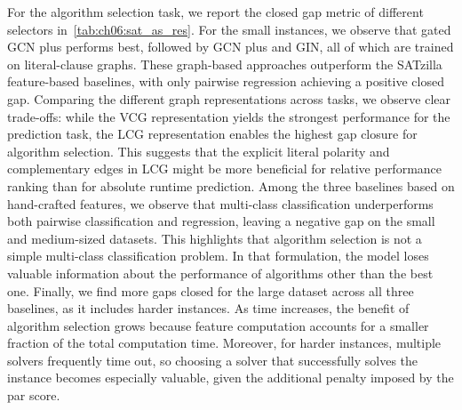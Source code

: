 For the algorithm selection task, we report the
closed gap metric of different selectors in~\cref{tab:ch06:sat_as_res}.
For the small instances, we observe that gated GCN plus performs best, followed by GCN plus and GIN, all of which are trained on literal-clause graphs. These graph-based approaches outperform the SATzilla feature-based baselines, with only pairwise regression achieving a positive closed gap. Comparing the different graph representations across tasks, we observe clear trade-offs: while the VCG representation yields the strongest performance for the prediction task, the LCG representation enables the highest gap closure for algorithm selection. This suggests that the explicit literal polarity and complementary edges in LCG might be more beneficial for relative performance ranking than for absolute runtime prediction.
Among the three baselines based on hand-crafted features, we observe that multi-class classification underperforms both pairwise classification and regression, leaving a negative gap on the small and medium-sized datasets. This highlights that algorithm selection is not a simple multi-class classification problem. In that formulation, the model loses valuable information about the performance of algorithms other than the best one.
Finally, we find more gaps closed for the large dataset across all three baselines, as it includes harder instances. As time increases, the benefit of algorithm selection grows because feature computation accounts for a smaller fraction of the total computation time. Moreover, for harder instances, multiple solvers frequently time out, so choosing a solver that successfully solves the instance becomes especially valuable, given the additional penalty imposed by the \gls{par} score.



